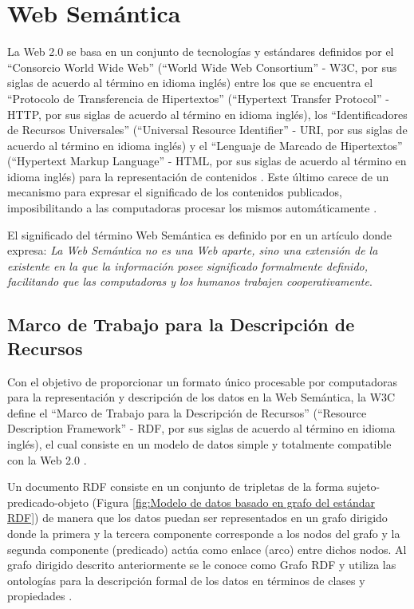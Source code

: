 \section{Web Semántica}
La Web 2.0 se basa en un conjunto de tecnologías y estándares definidos por el ``Consorcio World Wide Web'' (``World Wide Web Consortium'' - W3C, por sus siglas de acuerdo al término en idioma inglés) entre los que se encuentra el ``Protocolo de Transferencia de Hipertextos'' (``Hypertext Transfer Protocol'' - HTTP, por sus siglas de acuerdo al término en idioma inglés), los ``Identificadores de Recursos Universales'' (``Universal Resource Identifier'' - URI, por sus siglas de acuerdo al término en idioma inglés) y el ``Lenguaje de Marcado de Hipertextos'' (``Hypertext Markup Language'' - HTML, por sus siglas de acuerdo al término en idioma inglés) para la representación de contenidos \citep{Masinter2005}. Este último carece de un mecanismo para expresar el significado de los contenidos publicados, imposibilitando a las computadoras procesar los mismos automáticamente \citep{Hidalgo-Delgado2015}.

El significado del término Web Semántica es definido por \cite{Berners-Lee2001} en un artículo donde expresa: \textit{La Web Semántica no es una Web aparte, sino una extensión de la existente en la que la información posee significado formalmente definido, facilitando que las computadoras y los humanos trabajen cooperativamente}. 

\subsection{Marco de Trabajo para la Descripción de Recursos}

Con el objetivo de proporcionar un formato único procesable por computadoras para la representación y descripción de los datos en la Web Semántica, la W3C define el ``Marco de Trabajo para la Descripción de Recursos'' (``Resource Description Framework'' - RDF, por sus siglas de acuerdo al término en idioma inglés), el cual consiste en un modelo de datos simple y totalmente compatible con la Web 2.0 \citep{motik2009bridging,Heath2011}.

Un documento RDF consiste en un conjunto de tripletas de la forma sujeto-predicado-objeto (Figura \ref{fig:Modelo de datos basado en grafo del estándar RDF}) de manera que los datos puedan ser representados en un grafo dirigido donde la primera y la tercera componente corresponde a los nodos del grafo y la segunda componente (predicado) actúa como enlace (arco) entre dichos nodos. Al grafo dirigido descrito anteriormente se le conoce como Grafo RDF y utiliza las ontologías para la descripción formal de los datos en términos de clases y propiedades \citep{Klyne2004}.


